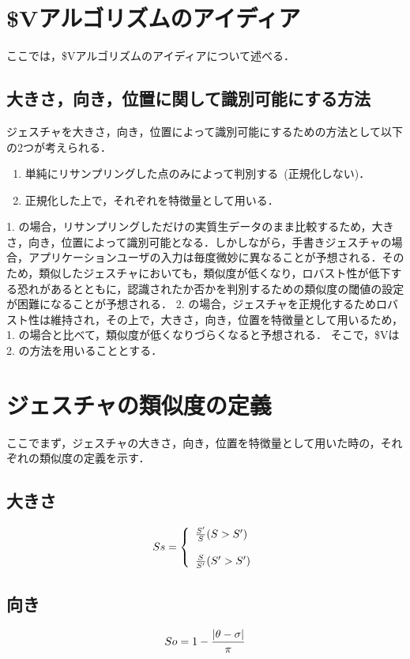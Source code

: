 \section{\$Vアルゴリズムのアイディア}
ここでは，\$Vアルゴリズムのアイディアについて述べる．

\subsection{大きさ，向き，位置に関して識別可能にする方法}
ジェスチャを大きさ，向き，位置によって識別可能にするための方法として以下の2つが考えられる．
\begin{enumerate}
\item 単純にリサンプリングした点のみによって判別する~(正規化しない)．
\item 正規化した上で，それぞれを特徴量として用いる．
\end{enumerate}
1. の場合，リサンプリングしただけの実質生データのまま比較するため，大きさ，向き，位置によって識別可能となる．しかしながら，手書きジェスチャの場合，アプリケーションユーザの入力は毎度微妙に異なることが予想される．そのため，類似したジェスチャにおいても，類似度が低くなり，ロバスト性が低下する恐れがあるとともに，認識されたか否かを判別するための類似度の閾値の設定が困難になることが予想される．
2. の場合，ジェスチャを正規化するためロバスト性は維持され，その上で，大きさ，向き，位置を特徴量として用いるため，1. の場合と比べて，類似度が低くなりづらくなると予想される．
そこで，\$Vは2. の方法を用いることとする．

\section{ジェスチャの類似度の定義}
ここでまず，ジェスチャの大きさ，向き，位置を特徴量として用いた時の，それぞれの類似度の定義を示す．

\subsection{大きさ}
\begin{equation}
S{\scriptsize s} = \left \{
\begin{array}{l}
\frac{S'}{S} (S>S') \\\\
\frac{S}{S'} (S'>S')
\end{array}
\right.
\end{equation}


\subsection{向き}
\begin{equation}
S{\scriptsize o} = 1 - \frac{|\theta - \sigma|}{\pi}
\end{equation}

